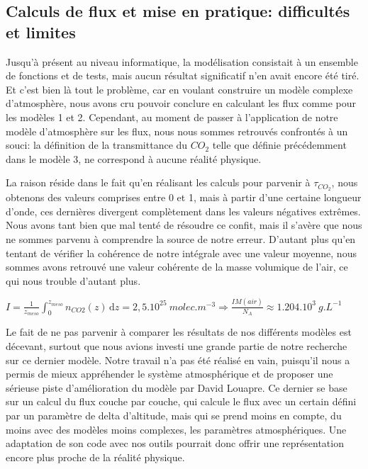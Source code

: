 \documentclass[a4paper, 12pt]{report} %
\begin{document}
\subsection{Calculs de flux et mise en pratique: difficultés et limites}

    Jusqu'à présent au niveau informatique, la modélisation consistait
à un ensemble de fonctions et de tests, mais aucun résultat significatif n'en avait encore été tiré. Et c'est bien là tout le problème, car en voulant construire un modèle complexe d'atmosphère, nous avons cru pouvoir conclure en calculant les flux comme pour les modèles 1 et 2. Cependant, au moment de passer à l'application de notre modèle d'atmosphère sur les flux, nous nous sommes retrouvés confrontés à un souci: la définition de la transmittance du $CO_2$ telle que définie précédemment dans le modèle 3, ne correspond à aucune réalité physique. \vspace{\baselineskip}

    La raison réside dans le fait qu'en réalisant les calculs pour
parvenir à $\tau_{CO_2}$, nous obtenons des valeurs comprises entre 0 et 1, mais à partir d'une certaine longueur d'onde, ces dernières divergent complètement dans les valeurs négatives extrêmes. Nous avons tant bien que mal tenté de résoudre ce confit, mais il s'avère que nous ne sommes parvenu à comprendre la source de notre erreur. D'autant plus qu'en tentant de vérifier la cohérence de notre intégrale avec une valeur moyenne, nous sommes avons retrouvé une valeur cohérente de la masse volumique de l'air, ce qui nous trouble d'autant plus. \vspace{\baselineskip}

$I = \frac{1}{z_{meso}}\int_{0}^{z_{meso}}n_{CO2}(z) \, \mathrm{d}z = 2,5.10^{25} \ molec.m^{-3} \Rightarrow \frac{IM(air)}{N_A} \approx 1.204.10^3 \ g.L^{-1}$ 
\vspace{\baselineskip}

    Le fait de ne pas parvenir à comparer les résultats de nos
différents modèles est décevant, surtout que nous avions investi une grande partie de notre recherche sur ce dernier modèle. Notre travail n'a pas été réalisé en vain, puisqu'il nous a permis de mieux appréhender le système atmosphérique et de proposer une sérieuse piste d'amélioration du modèle par David Louapre. Ce dernier se base sur un calcul du flux couche par couche, qui calcule le flux avec un certain défini par un paramètre de delta d'altitude, mais qui se prend moins en compte, du moins avec des modèles moins complexes, les paramètres atmosphériques. Une adaptation de son code avec nos outils pourrait donc offrir une représentation encore plus proche de la réalité physique.
    
\end{document}
